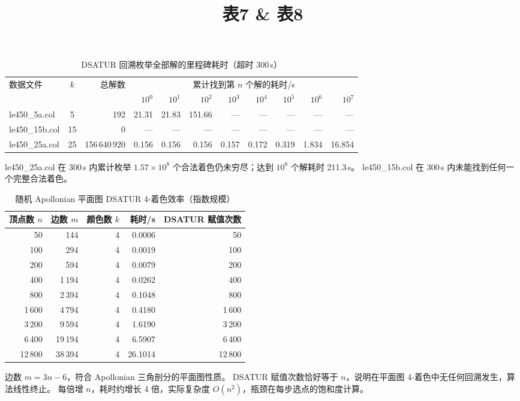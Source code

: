 \documentclass[UTF8,a4paper,12pt]{ctexart}
\title{表7 \& 表8}
\author{}
\date{}
\begin{document}
\maketitle

\begin{table}[htbp]
\centering
\caption{DSATUR 回溯枚举全部解的里程碑耗时（超时 300\,s）}
\label{tab:findall}
\small
\begin{tabular}{@{}l c r r r r r r r r r@{}}
\toprule
数据文件 & $k$ & 总解数 & \multicolumn{8}{c}{累计找到第 $n$ 个解的耗时/s} \\
\cmidrule(lr){4-11}
 &  &  & $10^{0}$ & $10^{1}$ & $10^{2}$ & $10^{3}$ & $10^{4}$ & $10^{5}$ & $10^{6}$ & $10^{7}$ \\
\midrule
le450\_5a.col  & 5  &       192 & 21.31 & 21.83 & 151.66 & --- & --- & --- & --- & --- \\
le450\_15b.col & 15 &         0 & ---   & ---   & ---    & --- & --- & --- & --- & --- \\
le450\_25a.col & 25 & 156\,640\,920 & 0.156 & 0.156 & 0.156 & 0.157 & 0.172 & 0.319 & 1.834 & 16.854 \\
\bottomrule
\end{tabular}

\medskip
\footnotesize
le450\_25a.col 在 300\,s 内累计枚举 $1.57\times10^{8}$ 个合法着色仍未穷尽；达到 $10^{8}$ 个解耗时 211.3\,s。
le450\_15b.col 在 300\,s 内未能找到任何一个完整合法着色。
\end{table}

\begin{table}[htbp]
\centering
\caption{随机 Apollonian 平面图 DSATUR 4-着色效率（指数规模）}
\label{tab:planar}
\small
\begin{tabular}{@{}r r r r r@{}}
\toprule
顶点数 $n$ & 边数 $m$ & 颜色数 $k$ & 耗时/s & DSATUR 赋值次数 \\
\midrule
    50 &    144 & 4 &    0.0006 &     50 \\
   100 &    294 & 4 &    0.0019 &    100 \\
   200 &    594 & 4 &    0.0079 &    200 \\
   400 &  1\,194 & 4 &    0.0262 &    400 \\
   800 &  2\,394 & 4 &    0.1048 &    800 \\
 1\,600 &  4\,794 & 4 &    0.4180 &  1\,600 \\
 3\,200 &  9\,594 & 4 &    1.6190 &  3\,200 \\
 6\,400 & 19\,194 & 4 &    6.5907 &  6\,400 \\
12\,800 & 38\,394 & 4 &   26.1014 & 12\,800 \\
\bottomrule
\end{tabular}

\medskip
\footnotesize
边数 $m = 3n - 6$，符合 Apollonian 三角剖分的平面图性质。
DSATUR 赋值次数恰好等于 $n$，说明在平面图 4-着色中无任何回溯发生，算法线性终止。
每倍增 $n$，耗时约增长 4 倍，实际复杂度 $O(n^2)$，瓶颈在每步选点的饱和度计算。
\end{table}
\end{document}
